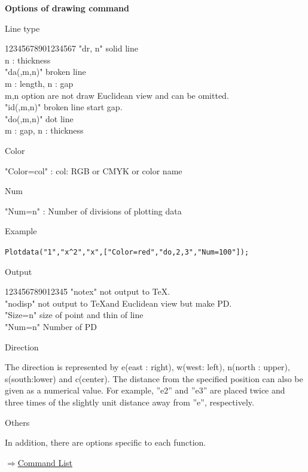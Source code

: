\documentclass[papersize,a4paper,12pt]{article}
\newenvironment{cmd}[2]{
\hypertarget{#2}{}
\begin{center}{\bf\large #1}\end{center}
\begin{description}
}{
\end{description}
\begin{flushright} \hyperlink{functionlist}{$\Rightarrow$Command List}\end{flushright}
}
\begin{document}
\begin{cmd}{Options of drawing command}{options}

\item Line type

\begin{tabbing}
1234\=5678901234567\=\kill
  \>    "dr, n"     \>solid line\\
  \>                    \> n : thickness\\
  \>    "da(,m,n)"  \>broken line \\
  \>                \> m : length, n : gap \\
  \>                 \>m,n option are not draw Euclidean view and can be omitted.\\
  \>    "id(,m,n)"   \>broken line start gap.\\
  \>    "do(,m,n)"  \>dot line\\
  \>                \>m : gap, n : thickness
\end{tabbing}

\item Color 

\hspace{10mm}"Color=col" : col: RGB or CMYK or color name

\item Num

\hspace{10mm}"Num=n" : Number of divisions of plotting data

\vspace{\baselineskip}
\hspace{5mm} Example

\hspace{10mm} \verb|Plotdata("1","x^2","x",["Color=red","do,2,3","Num=100"]);|

\item Output
\begin{tabbing}
  1234\=56789012345\=\kill
 \>    "notex"  \>not output to \TeX.\\
 \>    "nodisp" \>not output to \TeX and Euclidean view but make PD.\\
 \>    "Size=n"  \> size of point and thin of line\\
 \>    "Num=n"  \>Number of PD
\end{tabbing}

\item Direction

The direction is represented by e(east : right), w(west: left), n(north : upper), s(south:lower) and c(center). The distance from the specified position can also be given as a numerical value.  For example, ''e2'' and ''e3'' are placed twice and three times of the slightly unit distance away from ''e'', respectively. 

\begin{center}  \end{center}

\item Others

In addition, there are options specific to each function.

\end{cmd}
\end{document}
